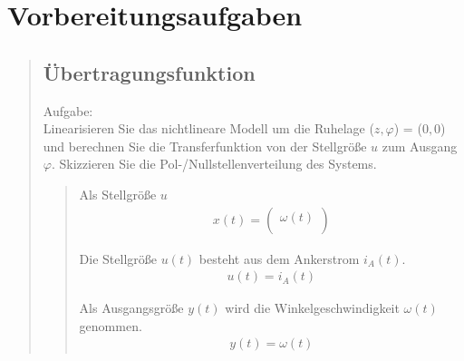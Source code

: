 \section{Vorbereitungsaufgaben}
\begin{quote}
	\hspace{-2em}
	\subsection{Übertragungsfunktion}
    Aufgabe:\\
    Linearisieren Sie das nichtlineare Modell um die Ruhelage ($z, \varphi$) = ($0, 0$) und berechnen Sie die
    Transferfunktion von der Stellgröße $u$ zum Ausgang $\varphi$. Skizzieren Sie die Pol-/Nullstellenverteilung des
    Systems.
	\begin{quote}
	   Als Stellgröße $u$
        \begin{equation*}
            \begin{split}
                x(t) = 
                    \begin {pmatrix}
                        \omega(t)\\
                    \end{pmatrix}
            \end{split}
        \end{equation*}
        
        Die Stellgröße $u(t)$ besteht aus dem Ankerstrom $i_A(t)$.
        \begin{equation*}
            \begin{split}
                u(t) = i_A (t)
            \end{split}
        \end{equation*}
        
        Als Ausgangsgröße $y(t)$ wird die Winkelgeschwindigkeit $\omega(t)$ genommen.
        \begin{equation*}
            \begin{split}
                y(t) = \omega(t)
            \end{split}
        \end{equation*}
        

\end{quote}
\end{quote}
